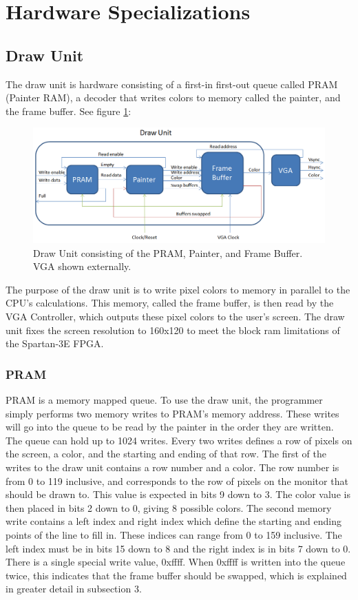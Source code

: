 \documentclass[onecolumn]{IEEEtran}
\begin{document}
\section{Hardware Specializations}
\subsection{Draw Unit}
The draw unit is hardware consisting of a first-in first-out queue called PRAM (Painter RAM), a decoder that writes colors to memory called the painter, and the frame buffer.  See figure \ref{fig:draw}:

\begin{figure}[H]
	\centering
	\includegraphics[width=1.0\textwidth]{draw.png}
	\caption{Draw Unit consisting of the PRAM, Painter, and Frame Buffer. VGA shown externally.}
	\label{fig:draw}
\end{figure}

The purpose of the draw unit is to write pixel colors to memory in parallel to the CPU’s calculations.  This memory, called the frame buffer, is then read by the VGA Controller, which outputs these pixel colors to the user’s screen.  The draw unit fixes the screen resolution to 160x120 to meet the block ram limitations of the Spartan-3E FPGA.

\subsubsection{PRAM}
PRAM is a memory mapped queue.  To use the draw unit, the programmer simply performs two memory writes to PRAM’s memory address.  These writes will go into the queue to be read by the painter in the order they are written.  The queue can hold up to 1024 writes.  Every two writes defines a row of pixels on the screen, a color, and the starting and ending of that row.  The first of the writes to the draw unit contains a row number and a color.  The row number is from 0 to 119 inclusive, and corresponds to the row of pixels on the monitor that should be drawn to.  This value is expected in bits 9 down to 3.  The color value is then placed in bits 2 down to 0, giving 8 possible colors.  The second memory write contains a left index and right index which define the starting and ending points of the line to fill in.  These indices can range from 0 to 159 inclusive.  The left index must be in bits 15 down to 8 and the right index is in bits 7 down to 0.  There is a single special write value, 0xffff.  When 0xffff is written into the queue twice, this indicates that the frame buffer should be swapped, which is explained in greater detail in subsection 3.
\end{document}
